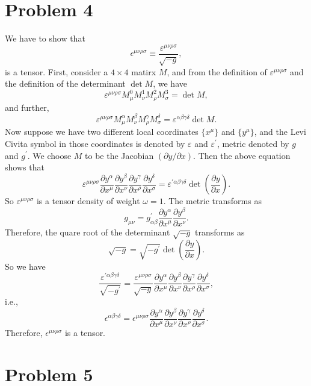 \documentclass{article}
\begin{document}
\section*{Problem 4}
We have to show that 
\begin{equation}
    \epsilon^{\mu \nu \rho \sigma} \equiv \frac{\varepsilon^{\mu \nu \rho \sigma}}{\sqrt{-g}},
\end{equation}
is a tensor.
First, consider a $4 \times 4$ matirx $M$, and from the definition of $\varepsilon^{\mu\nu\rho\sigma}$
and the definition of the determinant $\det M$, we have
\begin{equation}
    \varepsilon^{\mu \nu \rho \sigma} M^0_\mu M^1_\nu M^2_\rho M^3_\sigma = \det M,
\end{equation}
and further,
\begin{equation}
    \varepsilon^{\mu \nu \rho \sigma} M^\alpha_\mu M^\beta_\nu M^\gamma_\rho M^\delta_\sigma 
    = \varepsilon^{\alpha \beta \gamma \delta} \det M.
\end{equation}
Now suppose we have two different local coordinates $\{x^\mu\}$ and $\{y^\mu\}$,
and the Levi Civita symbol in those coordinates is denoted by $\varepsilon$ and $\varepsilon^\prime$,
metric denoted by $g$ and $g^\prime$.
We choose $M$ to be the Jacobian $(\partial y/ \partial x)$.
Then the above equation shows that
\begin{equation}
    \varepsilon^{\mu \nu \rho \sigma}\frac{\partial y^\alpha}{\partial x^\mu}
    \frac{\partial y^\beta}{\partial x^\nu}\frac{\partial y^\gamma}{\partial x^\rho}
    \frac{\partial y^\delta}{\partial x^\sigma} = \varepsilon^{\prime\alpha \beta \gamma \delta} \det\left(\frac{\partial y}{\partial x}\right).
\end{equation}
So $\varepsilon^{\mu \nu \rho \sigma}$ is a tensor density of weight $\omega = 1$. 
The metric transforms as
\begin{equation}
    g_{\mu \nu} = g^\prime_{\alpha \beta} \frac{\partial y^\alpha}{\partial x^\mu}
    \frac{\partial y^\beta}{\partial x^\nu}.
\end{equation}
Therefore, the quare root of the determinant $\sqrt{-g}$ transforms as
\begin{equation}
    \sqrt{-g} = \sqrt{-g^\prime} \det\left(\frac{\partial y}{\partial x}\right).
\end{equation}
So we have 
\begin{equation}
\frac{\varepsilon^{\prime\alpha \beta \gamma \delta}}{\sqrt{-g^\prime}}
= \frac{\varepsilon^{\mu \nu \rho \sigma}}{\sqrt{-g}}
\frac{\partial y^\alpha}{\partial x^\mu}
\frac{\partial y^\beta}{\partial x^\nu}\frac{\partial y^\gamma}{\partial x^\rho}
\frac{\partial y^\delta}{\partial x^\sigma},
\end{equation}
i.e.,
\begin{equation}
\epsilon^{\alpha \beta \gamma \delta}
= \epsilon^{\mu \nu \rho \sigma}
\frac{\partial y^\alpha}{\partial x^\mu}
\frac{\partial y^\beta}{\partial x^\nu}\frac{\partial y^\gamma}{\partial x^\rho}
\frac{\partial y^\delta}{\partial x^\sigma}.
\end{equation}
Therefore, $\epsilon^{\mu \nu \rho \sigma}$ is a tensor.



\section*{Problem 5}
\end{document}
